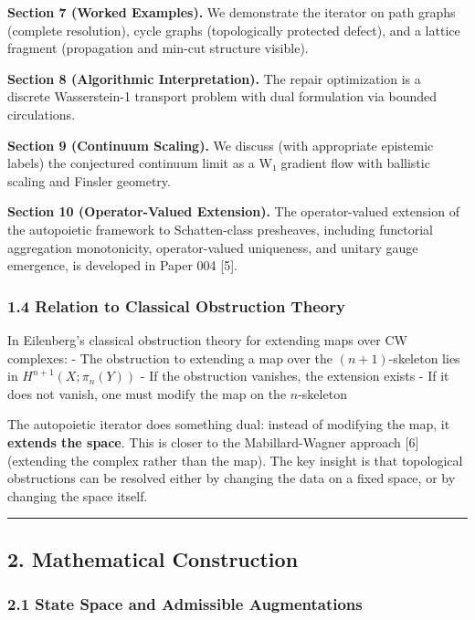 \documentclass[
]{article}
\begin{document}
\textbf{Section 7 (Worked Examples).} We demonstrate the iterator on
path graphs (complete resolution), cycle graphs (topologically protected
defect), and a lattice fragment (propagation and min-cut structure
visible).

\textbf{Section 8 (Algorithmic Interpretation).} The repair optimization
is a discrete Wasserstein-1 transport problem with dual formulation via
bounded circulations.

\textbf{Section 9 (Continuum Scaling).} We discuss (with appropriate
epistemic labels) the conjectured continuum limit as a W₁ gradient flow
with ballistic scaling and Finsler geometry.

\textbf{Section 10 (Operator-Valued Extension).} The operator-valued
extension of the autopoietic framework to Schatten-class presheaves,
including functorial aggregation monotonicity, operator-valued
uniqueness, and unitary gauge emergence, is developed in Paper 004
{[}5{]}.

\subsubsection{1.4 Relation to Classical Obstruction
Theory}\label{relation-to-classical-obstruction-theory}

In Eilenberg's classical obstruction theory for extending maps over CW
complexes: - The obstruction to extending a map over the
\((n+1)\)-skeleton lies in \(H^{n+1}(X; \pi_n(Y))\) - If the obstruction
vanishes, the extension exists - If it does not vanish, one must modify
the map on the \(n\)-skeleton

The autopoietic iterator does something dual: instead of modifying the
map, it \textbf{extends the space}. This is closer to the
Mabillard-Wagner approach {[}6{]} (extending the complex rather than the
map). The key insight is that topological obstructions can be resolved
either by changing the data on a fixed space, or by changing the space
itself.

\begin{center}\rule{0.5\linewidth}{0.5pt}\end{center}

\subsection{2. Mathematical
Construction}\label{mathematical-construction}

\subsubsection{2.1 State Space and Admissible
Augmentations}\label{state-space-and-admissible-augmentations}
\end{document}
